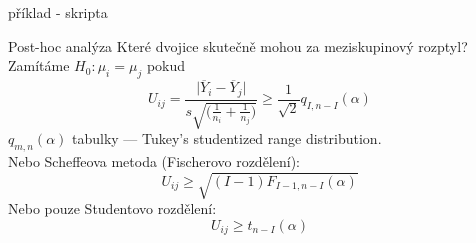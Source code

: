 \documentclass[smaller]{beamer}
\def\abs#1{\lvert#1\rvert}
\def\ol#1{\overline{#1}}
\def\xskip{{\vspace{2ex}}}
\begin{document}
\begin{frame}{příklad - skripta}
  
\end{frame}

\begin{frame}{Post-hoc analýza}
 Které dvojice skutečně mohou za meziskupinový rozptyl?\\

\xskip
 Zamítáme $H_0: \mu_i = \mu_j$ pokud
 \[
   U_{ij} = \frac{ \abs{\ol{Y}_i - \ol{Y}_j} }{ s \sqrt{\big(\frac{1}{n_i} + \frac{1}{n_j} \big)} } 
   \ge \frac{1}{\sqrt{2}} q_{I,n-I}(\alpha)
 \]
 $q_{m,n}(\alpha)$ tabulky --- Tukey's studentized range distribution.\\
 Nebo Scheffeova metoda (Fischerovo rozdělení):
 \[
    U_{ij} \ge \sqrt{(I-1)F_{I-1,n-I}(\alpha)}
 \]
 Nebo pouze Studentovo rozdělení:
 \[
     U_{ij} \ge t_{n-I}(\alpha)
 \] 
\end{frame}



\end{document}
